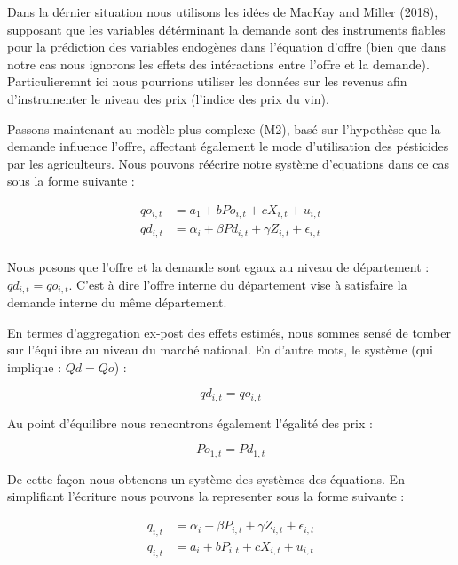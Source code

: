 \documentclass[11pt,]{article}
\begin{document}
Dans la dérnier situation nous utilisons les idées de MacKay and Miller
(2018), supposant que les variables détérminant la demande sont des
instruments fiables pour la prédiction des variables endogènes dans
l'équation d'offre (bien que dans notre cas nous ignorons les effets des
intéractions entre l'offre et la demande). Particulieremnt ici nous
pourrions utiliser les données sur les revenus afin d'instrumenter le
niveau des prix (l'indice des prix du vin).

Passons maintenant au modèle plus complexe (M2), basé sur l'hypothèse
que la demande influence l'offre, affectant également le mode
d'utilisation des pésticides par les agriculteurs. Nous pouvons réécrire
notre système d'equations dans ce cas sous la forme suivante :

\begin{align*}
  qo_{i,t} & = a_1 + b Po_{i,t} + c X_{i,t} + u_{i,t} \\ 
  qd_{i,t} & = \alpha_{i} + \beta Pd_{i,t} + \gamma Z_{i,t} + \epsilon_{i,t}  \\
\end{align*}

Nous posons que l'offre et la demande sont egaux au niveau de
département : \(qd_{i,t} = qo_{i,t}\). C'est à dire l'offre interne du
département vise à satisfaire la demande interne du même département.

En termes d'aggregation ex-post des effets estimés, nous sommes sensé de
tomber sur l'équilibre au niveau du marché national. En d'autre mots, le
système (qui implique : \(Qd = Qo\)) :

\begin{equation*}
  qd_{i,t} = qo_{i,t}
\end{equation*}

Au point d'équilibre nous rencontrons également l'égalité des prix :

\begin{equation*}
  Po_{1,t} = Pd_{1,t}
\end{equation*}

De cette façon nous obtenons un système des systèmes des équations. En
simplifiant l'écriture nous pouvons la representer sous la forme
suivante :

\begin{align*}
  q_{i,t} & = \alpha_{i} + \beta P_{i,t} + \gamma Z_{i,t} + \epsilon_{i,t} \\
  q_{i,t} & = a_i + b P_{i,t} + c X_{i,t} + u_{i,t}
\end{align*}
\end{document}
